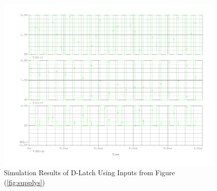 \FloatBarrier

\FloatBarrier

\begin{figure}[h!]
	\centering
	\includegraphics[width=1\linewidth]{./images/spec_sim}
	\caption{Simulation Results of D-Latch Using Inputs from Figure (\ref{fig:supplys})}
	\label{fig:spec_sim}
\end{figure}

\FloatBarrier
